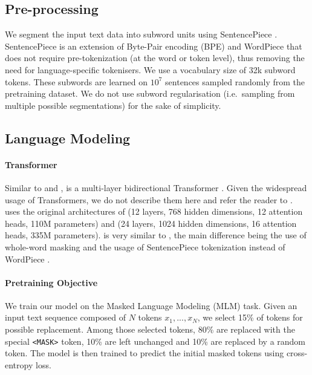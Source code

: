 


\subsection{Pre-processing}
We segment the input text data into subword units using SentencePiece \cite{kudo2018sentencepiece}.
SentencePiece is an extension of Byte-Pair encoding (BPE) \cite{sennrich2016neural} and WordPiece \cite{kudo2018subword} that does not require pre-tokenization (at the word or token level), thus removing the need for language-specific tokenisers.
We use a vocabulary size of 32k subword tokens. These subwords are learned on $10^7$ sentences sampled randomly from the pretraining dataset.
We do not use subword regularisation (i.e.~sampling from multiple possible segmentations) for the sake of simplicity.


\subsection{Language Modeling}

\paragraph{Transformer}
Similar to \roberta and \bert, \camembert is a multi-layer bidirectional Transformer \cite{vaswani2017attention}. Given the widespread usage of Transformers, we do not describe them here and refer the reader to \citep{vaswani2017attention}.
\camembert uses the original architectures of \bertbase (12 layers, 768 hidden dimensions, 12 attention heads, 110M parameters) and \bertlarge (24 layers, 1024 hidden dimensions, 16 attention heads, 335M parameters).
\camembert is very similar to \roberta, the main difference being the use of whole-word masking and the usage of SentencePiece tokenization \cite{kudo2018sentencepiece} instead of WordPiece \cite{schuster2012japanese}.

\paragraph{Pretraining Objective}
We train our model on the Masked Language Modeling (MLM) task.
Given an input text sequence composed of $N$ tokens $x_1, ..., x_N$, we select 15\% of tokens for possible replacement. Among those selected tokens, 80\% are replaced with the special \texttt{<MASK>} token, 10\% are left unchanged and 10\% are replaced by a random token. The model is then trained to predict the initial masked tokens using cross-entropy loss.

